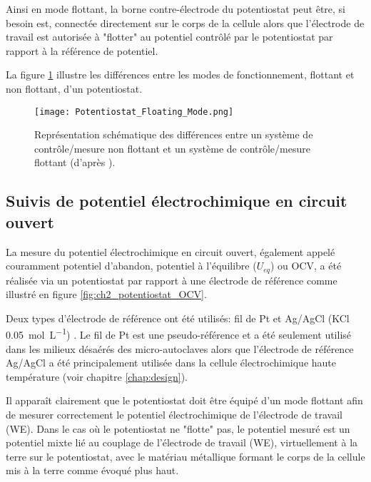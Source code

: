 \begin{refsection}
    Ainsi en mode flottant, la borne contre-électrode du potentiostat peut être, si besoin est,    
    connectée directement sur le corps de la cellule  alors que
    l'électrode de travail est autorisée à "flotter" au potentiel contrôlé par le potentiostat 
    par rapport à la référence de potentiel.

    La figure \ref{fig:ch2_floating_mode} illustre les différences entre les modes de fonctionnement, flottant et non
    flottant, d'un potentiostat. 

    \begin{figure}[H]
        \centering
            \texttt{[image: Potentiostat\_Floating\_Mode.png]}
        \caption[Représentation schématique des différences entre un système de contrôle/mesure non flottant 
        et un système de contrôle/mesure flottant.]
        {Représentation schématique des différences entre un système de contrôle/mesure non flottant et un système de
        contrôle/mesure flottant (d'après \citet{Barsoukov2005}).}
        \label{fig:ch2_floating_mode}
    \end{figure}

    

    \subsection{Suivis de potentiel électrochimique en circuit ouvert}\label{subsec:ch2_ECP}

    La mesure du potentiel électrochimique en circuit ouvert, également appelé couramment potentiel d'abandon, potentiel
    à l'équilibre ($U_{eq}$) ou OCV, a été réalisée via un potentiostat par rapport à une électrode de référence 
    comme illustré en figure \ref{fig:ch2_potentiostat_OCV}.
   
    Deux types d'électrode de référence ont été utilisés: fil de Pt et Ag/AgCl (KCl
    \SI{0.05}{\mole\per\liter}) \citep{King1989}. Le fil de Pt est une pseudo-référence et a été seulement utilisé dans les milieux désaérés
    des micro-autoclaves alors que l'électrode de référence Ag/AgCl \citep{King1989} a été principalement utilisée dans la cellule 
    électrochimique haute température (voir chapitre \ref{chap:design}).

    Il apparaît clairement que le potentiostat doit être équipé d'un mode flottant afin de mesurer correctement le
    potentiel électrochimique de l'électrode de travail (WE). Dans le cas où le potentiostat ne "flotte" pas, le
    potentiel mesuré est un potentiel mixte lié au couplage de l'électrode de travail (WE), virtuellement à la terre sur
    le potentiostat, avec le matériau
    métallique formant le corps de la cellule mis à la terre comme évoqué plus haut.


\end{refsection}
